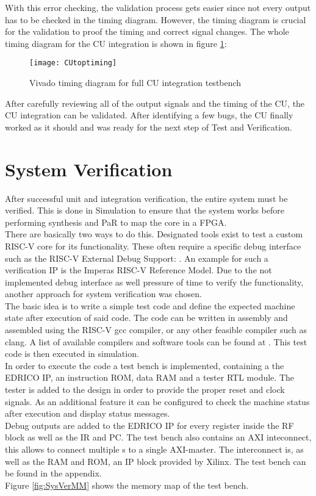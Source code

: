 With this error checking, the validation process gets easier since not every output has to be checked in the timing diagram. However, the timing diagram is crucial for the validation to proof the timing and correct signal changes. The whole timing diagram for the CU integration is shown in figure \ref{fig:cutoptiming}:
\begin{figure}[H]
	\centering
	\texttt{[image: CUtoptiming]}
	\caption{Vivado timing diagram for full CU integration testbench}
	\label{fig:cutoptiming}
\end{figure}
After carefully reviewing all of the output signals and the timing of the CU, the CU integration can be validated. After identifying a few bugs, the CU finally worked as it should and was ready for the next step of Test and Verification.

\section{System Verification}
After successful unit and integration verification, the entire system must be verified. This is done in Simulation to ensure that the system works before performing synthesis and \ac{PaR} to map the core in a \ac{FPGA}.\\
There are basically two ways to do this. Designated tools exist to test a custom RISC-V core for its functionality. These often require a specific debug interface such as the RISC-V External Debug Support: \cite{riscv:debug}. An example for such a verification IP is the Imperas RISC-V Reference Model. Due to the not implemented debug interface as well pressure of time to verify the functionality, another approach for system verification was chosen. \\
The basic idea is to write a simple test code and define the expected machine state after execution of said code. The code can be written in assembly and assembled using the RISC-V gcc compiler, or any other feasible compiler such as clang. A list of available compilers and software tools can be found at \cite{RV:software}. This test code is then executed in simulation.\\
In order to execute the code a test bench is implemented, containing a the \ac{EDRICO} \ac{IP}, an instruction \ac{ROM}, data \ac{RAM} and a tester \ac{RTL} module. The tester is added to the design in order to provide the proper reset and clock signals. As an additional feature it can be configured to check the machine status after execution and display status messages.\\
Debug outputs are added to the \ac{EDRICO} \ac{IP} for every register inside the \ac{RF} block as well as the \ac{IR} and \ac{PC}. The test bench also contains an AXI inteconnect, this allows to connect multiple s to a single AXI-master. The interconnect is, as well as the \ac{RAM} and \ac{ROM}, an \ac{IP} block provided by Xilinx. The test bench can be found in the appendix.\\
Figure \ref{fig:SysVerMM} shows the memory map of the test bench.


